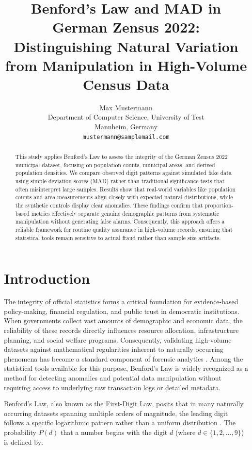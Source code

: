 \documentclass[11pt,a4paper]{article}
\title{\bfseries Benford's Law and MAD in German Zensus 2022: Distinguishing Natural Variation from Manipulation in High-Volume Census Data}
\author{%
Max Mustermann\\
{\small Department of Computer Science, University of Test}\\
{\small Mannheim, Germany}\\
{\small \texttt{mustermann@samplemail.com}}
}
\date{}
\begin{document}
\maketitle
\thispagestyle{empty}

\begin{abstract}
\noindent
This study applies Benford's Law to assess the integrity of the German Zensus 2022 municipal dataset, focusing on population counts, municipal areas, and derived population densities. We compare observed digit patterns against simulated fake data using simple deviation scores (MAD) rather than traditional significance tests that often misinterpret large samples. Results show that real-world variables like population counts and area measurements align closely with expected natural distributions, while the synthetic controls display clear anomalies. These findings confirm that proportion-based metrics effectively separate genuine demographic patterns from systematic manipulation without generating false alarms. Consequently, this approach offers a reliable framework for routine quality assurance in high-volume records, ensuring that statistical tools remain sensitive to actual fraud rather than sample size artifacts.
\end{abstract}

\section{Introduction}
The integrity of official statistics forms a critical foundation for evidence-based policy-making, financial regulation, and public trust in democratic institutions. When governments collect vast amounts of demographic and economic data, the reliability of these records directly influences resource allocation, infrastructure planning, and social welfare programs. Consequently, validating high-volume datasets against mathematical regularities inherent to naturally occurring phenomena has become a standard component of forensic analytics \cite{Petras2025DetectingBL}. Among the statistical tools available for this purpose, Benford's Law is widely recognized as a method for detecting anomalies and potential data manipulation without requiring access to underlying raw transaction logs or detailed metadata.

Benford's Law, also known as the First-Digit Law, posits that in many naturally occurring datasets spanning multiple orders of magnitude, the leading digit follows a specific logarithmic pattern rather than a uniform distribution \cite{Kossler2024SomeNI}. The probability $P(d)$ that a number begins with the digit $d$ (where $d \in \{1, 2, \dots, 9\}$) is defined by:
\end{document}
